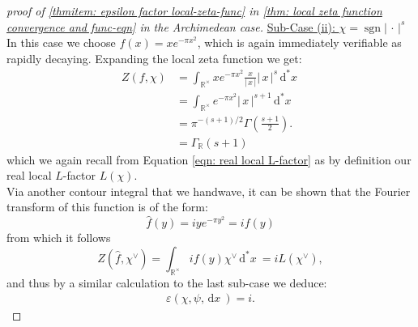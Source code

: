 \documentclass[11pt, x11names, openany]{book}
\newcommand{\rr}{\mathbb{R}}
\renewcommand{\brack}[1]{\left(   #1 \right)}
\newcommand{\abs}[1]{\left| \, #1  \,\right|}
\renewcommand{\hat}{\widehat}
\DeclareMathOperator{\sgn}{sgn}
\newcommand{\dx}{\, \mathrm{d}x \ }
\renewcommand{\d}[1]{\, \mathrm{d}#1 \ }
\begin{document}
\begin{proof}[proof of \ref{thmitem: epsilon factor local-zeta-func} in \ref{thm: local zeta function convergence and func-eqn} in the Archimedean case]
\underline{Sub-Case (ii): $\chi = \sgn \abs{\cdot}^s$}\\
In this case we choose $f(x) = xe^{-\pi x^2}$, which is again immediately verifiable as rapidly decaying. Expanding the local zeta function we get:
\begin{align*}
    Z(f, \chi) &= \int_{\rr^\times} x e^{-\pi x^2} \frac{x}{\abs{x}} \abs{x}^s \d{^*x}\\
    &= \int_{\rr^\times} e^{-\pi x^2} \abs{x}^{s+1} \d{^*x}\\
    &= \pi^{-(s+1)/2} \Gamma\brack{\frac{s+1}{2}}.\\
    &= \Gamma_\rr(s+1)
\end{align*}
which we again recall from Equation \ref{eqn: real local L-factor} as by definition our real local $L$-factor $L(\chi)$.\\
Via another contour integral that we handwave, it can be shown that the Fourier transform of this function is of the form:
\begin{equation*}
    \hat{f}(y) = i y e^{- \pi y^2 } = i f(y)
\end{equation*} 
from which it follows 
\begin{equation*}
    Z(\hat{f}, \chi^\lor) = \int_{\rr^\times} i f(y) \chi^\lor \d{^*x} = i L(\chi^\lor),
\end{equation*}
and thus by a similar calculation to the last sub-case we deduce:
\begin{align}
\label{eqn: real epsilon factor 2}
    \varepsilon(\chi, \psi, \dx) = i.
\end{align}


\end{proof}
\end{document}
